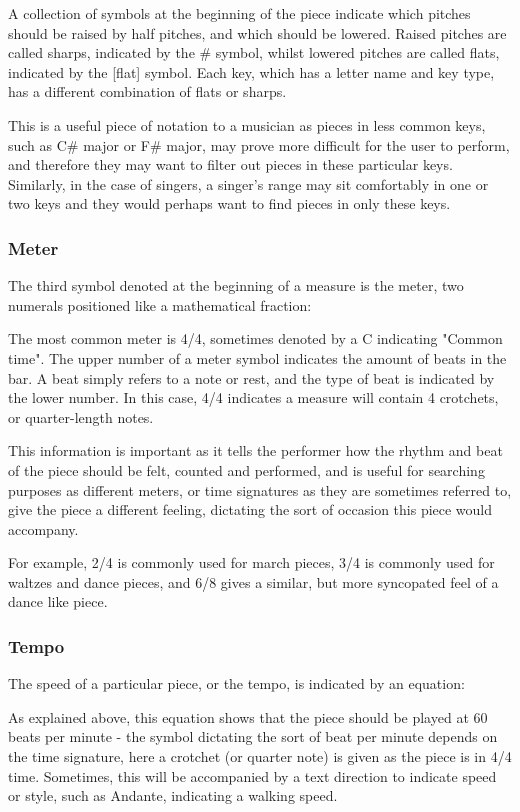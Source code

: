 A collection of symbols at the beginning of the piece indicate which pitches should be raised by half pitches, and which should be lowered. Raised pitches are called sharps, indicated by the \# symbol, whilst lowered pitches are called flats, indicated by the [flat] symbol. Each key, which has a letter name and key type, has a different combination of flats or sharps.

This is a useful piece of notation to a musician as pieces in less common keys, such as C\# major or F\# major, may prove more difficult for the user to perform, and therefore they may want to filter out pieces in these particular keys. Similarly, in the case of singers, a singer's range may sit comfortably in one or two keys and they would perhaps want to find pieces in only these keys. 

\subsubsection{Meter}
The third symbol denoted at the beginning of a measure is the meter, two numerals positioned like a mathematical fraction:

The most common meter is 4/4, sometimes denoted by a C indicating "Common time". The upper number of a meter symbol indicates the amount of beats in the bar. A beat simply refers to a note or rest, and the type of beat is indicated by the lower number. In this case, 4/4 indicates a measure will contain 4 crotchets, or quarter-length notes.

This information is important as it tells the performer how the rhythm and beat of the piece should be felt, counted and performed, and is useful for searching purposes as different meters, or time signatures as they are sometimes referred to, give the piece a different feeling, dictating the sort of occasion this piece would accompany. 

For example, 2/4 is commonly used for march pieces, 3/4 is commonly used for waltzes and dance pieces, and 6/8 gives a similar, but more syncopated feel of a dance like piece.

\subsubsection{Tempo}
The speed of a particular piece, or the tempo, is indicated by an equation:

As explained above, this equation shows that the piece should be played at 60 beats per minute - the symbol dictating the sort of beat per minute depends on the time signature, here a crotchet (or quarter note) is given as the piece is in 4/4 time. Sometimes, this will be accompanied by a text direction to indicate speed or style, such as Andante, indicating a walking speed.

